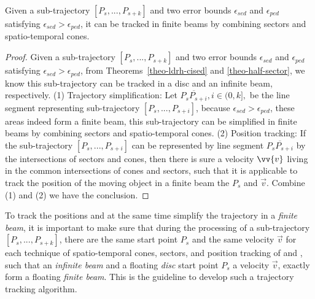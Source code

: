 
\begin{proposition}
	\label{theo-binary}
	Given a sub-trajectory $[P_s,...,P_{s+k}]$ and two error bounds $\epsilon_{sed}$ and $\epsilon_{ped}$ satisfying $\epsilon_{sed} > \epsilon_{ped}$, it can be tracked in finite beams by combining sectors and spatio-temporal cones.
\end{proposition}

\begin{proof}
Given a sub-trajectory $[P_s,...,P_{s+k}]$ and two error bounds $\epsilon_{sed}$ and $\epsilon_{ped}$ satisfying $\epsilon_{sed} > \epsilon_{ped}$, from Theorems~\ref{theo-ldrh-cised} and \ref{theo-half-sector}, we know this sub-trajectory can be tracked in a disc and an infinite beam, respectively.  
%
(1) Trajectory simplification: Let $\overline{P_sP_{s+i}}, i\in (0,k],$ be the line segment representing sub-trajectory $[P_s,...,P_{s+i}]$, because $\epsilon_{sed} > \epsilon_{ped}$, these areas indeed form a finite beam, \ie this sub-trajectory can be simplified in finite beams by combining sectors and spatio-temporal cones.
%
(2) Position tracking: If the sub-trajectory $[P_s,...,P_{s+i}]$ can be represented by line segment $\overline{P_sP_{s+i}}$ by the intersections of sectors and cones, then there is sure a velocity $\vv{v}$ living in the common intersections of cones and sectors, such that it is applicable to track the position of the moving object in a finite beam \wrt the $P_s$ and $\vec{v}$. 
Combine (1) and (2) we have the conclusion.
\end{proof}


To track the positions and at the same time simplify the trajectory in a \emph{finite beam}, it is important to make sure that during the processing of a sub-trajectory $[P_s,...,P_{s+k}]$, there are the same start point $P_s$ and the same velocity $\vec{v}$ for each technique of spatio-temporal cones, sectors, and position tracking of \ped and \sed, such that an \emph{infinite beam} and a floating \emph{disc} \wrt start point $P_s$ a velocity $\vec{v}$, exactly form a floating \emph{finite beam}. This is the guideline to develop such a trajectory tracking algorithm. 



